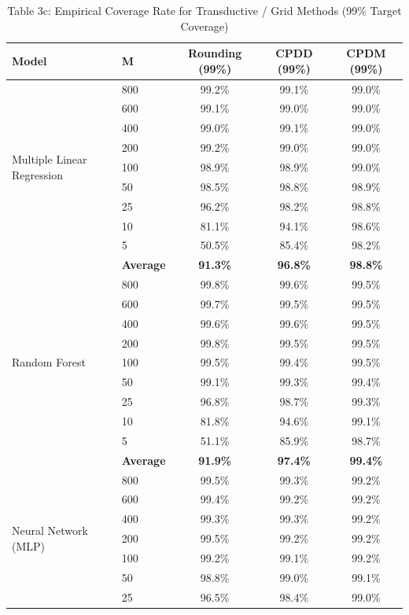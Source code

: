 \documentclass[11pt,a4paper]{article}
\begin{document}
\begin{table}[H]
\centering
\caption{Table 3c: Empirical Coverage Rate for Transductive / Grid Methods (99\% Target Coverage)}
\label{tab:mvp_tab3c}
\scriptsize
\begin{tabular}{llccc}
\toprule
Model & M & Rounding (99\%) & CPDD (99\%) & CPDM (99\%) \\
\midrule
\multirow{9}{*}{Multiple Linear Regression}
 & 800 & 99.2\% & 99.1\% & 99.0\% \\
 & 600 & 99.1\% & 99.0\% & 99.0\% \\
 & 400 & 99.0\% & 99.1\% & 99.0\% \\
 & 200 & 99.2\% & 99.0\% & 99.0\% \\
 & 100 & 98.9\% & 98.9\% & 99.0\% \\
 & 50  & 98.5\% & 98.8\% & 98.9\% \\
 & 25  & 96.2\% & 98.2\% & 98.8\% \\
 & 10  & 81.1\% & 94.1\% & 98.6\% \\
 & 5   & 50.5\% & 85.4\% & 98.2\% \\
 & \textbf{Average} & \textbf{91.3\%} & \textbf{96.8\%} & \textbf{98.8\%} \\
\midrule
\multirow{9}{*}{Random Forest}
 & 800 & 99.8\% & 99.6\% & 99.5\% \\
 & 600 & 99.7\% & 99.5\% & 99.5\% \\
 & 400 & 99.6\% & 99.6\% & 99.5\% \\
 & 200 & 99.8\% & 99.5\% & 99.5\% \\
 & 100 & 99.5\% & 99.4\% & 99.5\% \\
 & 50  & 99.1\% & 99.3\% & 99.4\% \\
 & 25  & 96.8\% & 98.7\% & 99.3\% \\
 & 10  & 81.8\% & 94.6\% & 99.1\% \\
 & 5   & 51.1\% & 85.9\% & 98.7\% \\
 & \textbf{Average} & \textbf{91.9\%} & \textbf{97.4\%} & \textbf{99.4\%} \\
\midrule
\multirow{9}{*}{Neural Network (MLP)}
 & 800 & 99.5\% & 99.3\% & 99.2\% \\
 & 600 & 99.4\% & 99.2\% & 99.2\% \\
 & 400 & 99.3\% & 99.3\% & 99.2\% \\
 & 200 & 99.5\% & 99.2\% & 99.2\% \\
 & 100 & 99.2\% & 99.1\% & 99.2\% \\
 & 50  & 98.8\% & 99.0\% & 99.1\% \\
 & 25  & 96.5\% & 98.4\% & 99.0\% \\

\end{tabular}
\end{table}
\end{document}
